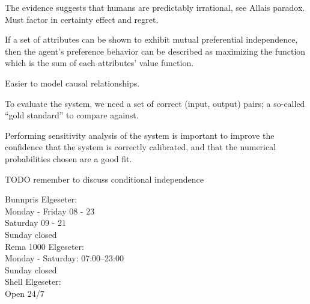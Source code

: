 The evidence suggests that humans are predictably irrational, see Allais paradox. Must factor in certainty effect and regret.

If a set of attributes can be shown to exhibit mutual preferential independence, then the agent's preference behavior can be described as maximizing the function which is the sum of each attributes' value function.

Easier to model causal relationships.

To evaluate the system, we need a set of correct (input, output) pairs; a so-called ``gold standard'' to compare against.

Performing sensitivity analysis of the system is important to improve the confidence that the system is correctly calibrated, and that the numerical probabilities chosen are a good fit.

TODO remember to discuss conditional independence



Bunnpris Elgeseter:\\
Monday - Friday	08 - 23\\
Saturday 09 - 21\\
Sunday  closed\\

Rema 1000 Elgeseter:\\
Monday - Saturday: 07:00–23:00\\
Sunday closed\\

Shell Elgeseter:\\
Open 24/7